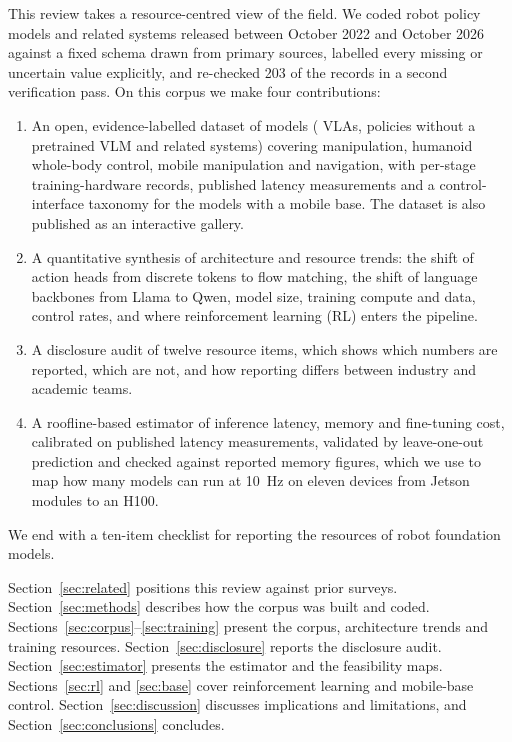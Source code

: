 \documentclass[applsci,review,submit,pdftex,oneauthor]{Definitions/mdpi}
\begin{document}
This review takes a resource-centred view of the field. We coded \nModels{} robot policy models and related systems released between October 2022 and October 2026 against a fixed schema drawn from primary sources, labelled every missing or uncertain value explicitly, and re-checked 203 of the records in a second verification pass. On this corpus we make four contributions:
\begin{enumerate}
\item An open, evidence-labelled dataset of \nModels{} models (\nVLA{} VLAs, \nVA{} policies without a pretrained VLM and \nOther{} related systems) covering manipulation, humanoid whole-body control, mobile manipulation and navigation, with \nTGrecords{} per-stage training-hardware records, \nAnchors{} published latency measurements and a control-interface taxonomy for the \nMobile{} models with a mobile base. The dataset is also published as an interactive gallery.
\item A quantitative synthesis of architecture and resource trends: the shift of action heads from discrete tokens to flow matching, the shift of language backbones from Llama to Qwen, model size, training compute and data, control rates, and where reinforcement learning (RL) enters the pipeline.
\item A disclosure audit of twelve resource items, which shows which numbers are reported, which are not, and how reporting differs between industry and academic teams.
\item A roofline-based estimator of inference latency, memory and fine-tuning cost, calibrated on published latency measurements, validated by leave-one-out prediction and checked against reported memory figures, which we use to map how many models can run at 10~Hz on eleven devices from Jetson modules to an H100.
\end{enumerate}
We end with a ten-item checklist for reporting the resources of robot foundation models.

Section~\ref{sec:related} positions this review against prior surveys. Section~\ref{sec:methods} describes how the corpus was built and coded. Sections~\ref{sec:corpus}--\ref{sec:training} present the corpus, architecture trends and training resources. Section~\ref{sec:disclosure} reports the disclosure audit. Section~\ref{sec:estimator} presents the estimator and the feasibility maps. Sections~\ref{sec:rl} and \ref{sec:base} cover reinforcement learning and mobile-base control. Section~\ref{sec:discussion} discusses implications and limitations, and Section~\ref{sec:conclusions} concludes.
\end{document}
